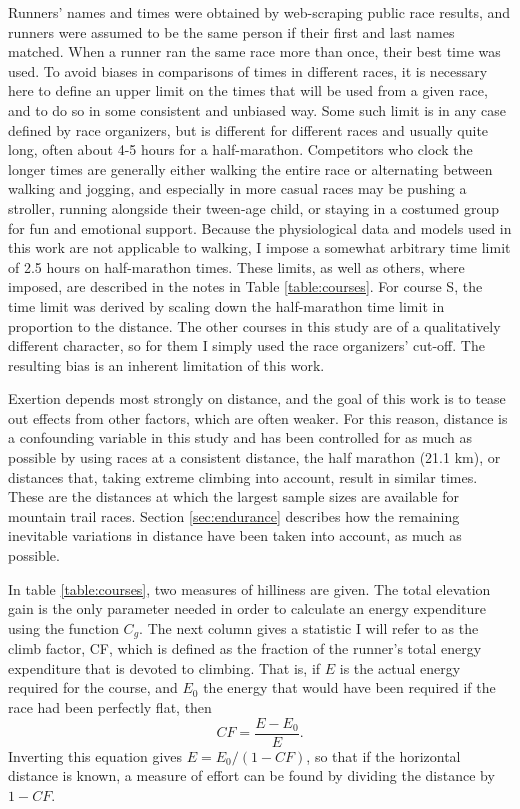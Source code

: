 \documentclass[10pt,letterpaper]{article}
\begin{document}
Runners' names and times were obtained by web-scraping public race results,
and runners were assumed to be the same person if their first and last names matched.
When a runner ran the same race more than once, their best time was used.
To avoid biases in comparisons of times in different races, it is necessary here to define
an upper limit on the times that will be used from a given race, and to do so in some
consistent and unbiased way. Some such limit is in any case
defined by race organizers, but is different for different races and usually quite long,
often about 4-5 hours for a half-marathon. Competitors who clock the longer times are generally
either walking the entire race or alternating between walking and jogging, and especially in
more casual races may be pushing a stroller, running alongside their tween-age child, or staying
in a costumed group for fun and emotional support. Because the physiological data and models
used in this work are not applicable to walking, I impose a somewhat arbitrary time limit of 2.5 hours
on half-marathon times. These limits, as well as others, where imposed,
are described in the notes in Table \ref{table:courses}. For course S, the time limit was derived by
scaling down the half-marathon time limit in proportion to the distance.
The other courses in this study are of a qualitatively different character, so for them I simply
used the race organizers' cut-off. The resulting bias is an inherent limitation of this work.

Exertion depends most strongly on distance, and the goal of this work is to tease out effects
from other factors, which are often weaker. For this reason, distance is a confounding variable
in this study and has been controlled for as much as possible by using races at a consistent
distance, the half marathon (21.1 km), or distances that, taking extreme climbing into account,
result in similar times. These are the distances at which the largest sample sizes are available for
mountain trail races. Section \ref{sec:endurance} describes how the remaining inevitable
variations in distance have been taken into account, as much as possible.

In table \ref{table:courses}, two measures of hilliness are given. The total elevation gain
is the only parameter needed in order to calculate an energy expenditure using the function
$C_g$. The next column gives a statistic I will refer to as the climb factor, CF, which is
defined as the fraction of the runner's total energy expenditure that is devoted to climbing.
That is, if $E$ is the actual energy required for the course, and $E_0$ the energy that
would have been required if the race had been perfectly flat, then 
\begin{equation}
  CF=\frac{E-E_0}{E}.
\end{equation}
Inverting this equation gives $E=E_0/(1-CF)$, so that if the horizontal distance is
known, a measure of effort can be found by dividing the distance by $1-CF$.
\end{document}
